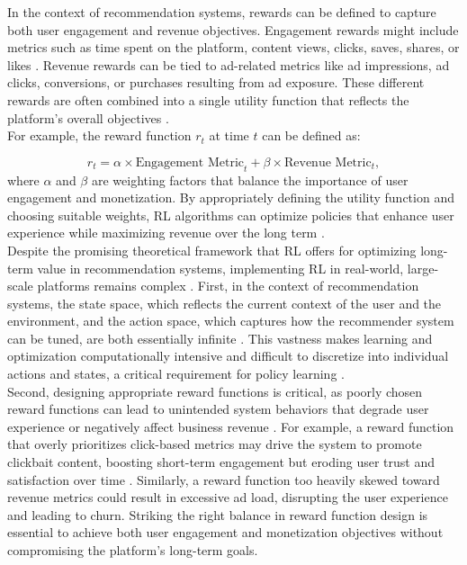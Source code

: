 \documentclass[final]{anthology-ch}         %
\begin{document}
In the context of recommendation systems, rewards can be defined to capture both user engagement and revenue objectives. Engagement rewards might include metrics such as time spent on the platform, content views, clicks, saves, shares, or likes \cite{wang2022surrogate}. Revenue rewards can be tied to ad-related metrics like ad impressions, ad clicks, conversions, or purchases resulting from ad exposure. These different rewards are often combined into a single utility function that reflects the platform’s overall objectives \cite{zhao2020jointly} \cite{zou2019reinforcement} \cite{xu2023optimizing}.\\

For example, the reward function  $r_t$  at time  $t$  can be defined as:

$$
r_t = \alpha \times \text{Engagement Metric}_t + \beta \times \text{Revenue Metric}_t,
$$ where  $\alpha$  and  $\beta$  are weighting factors that balance the importance of user engagement and monetization. By appropriately defining the utility function and choosing suitable weights, RL algorithms can optimize policies that enhance user experience while maximizing revenue over the long term \cite{zhao2020jointly, zhao2021dear, yan2020ads, sagtani2024ad}. \\


Despite the promising theoretical framework that RL offers for optimizing long-term value in recommendation systems, implementing RL in real-world, large-scale platforms remains complex \cite{dulac2021challenges}. First, in the context of recommendation systems, the state space, which reflects the current context of the user and the environment, and the action space, which captures how the recommender system can be tuned, are both essentially infinite \cite{zhu2021overview}. This vastness makes learning and optimization computationally intensive and difficult to discretize into individual actions and states, a critical requirement for policy learning \cite{afsar2022reinforcement} . \\ 

Second, designing appropriate reward functions is critical, as poorly chosen reward functions can lead to unintended system behaviors that degrade user experience or negatively affect business revenue \cite{everitt2021reward}. For example, a reward function that overly prioritizes click-based metrics may drive the system to promote clickbait content, boosting short-term engagement but eroding user trust and satisfaction over time \cite{wu2017returning}. Similarly, a reward function too heavily skewed toward revenue metrics could result in excessive ad load, disrupting the user experience and leading to churn. Striking the right balance in reward function design is essential to achieve both user engagement and monetization objectives without compromising the platform’s long-term goals.\\
\end{document}
